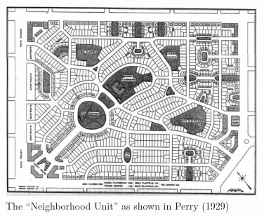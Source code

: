 \begin{figure}
\hypertarget{fig:nup}{%
\centering
\includegraphics[width=0.85\textwidth,height=\textheight]{./figures/perry_neighborhood_unit.png}
\caption{The ``Neighborhood Unit'' as shown in Perry
(1929)}\label{fig:nup}
}
\end{figure}

\begin{pandoccrossrefsubfigures}


\caption[{Network vs.~Euclidean-based Segregation Indices}]{Network
vs.~Euclidean-based Segregation Indices}

\label{fig:net_vs_euc}

\end{pandoccrossrefsubfigures}

